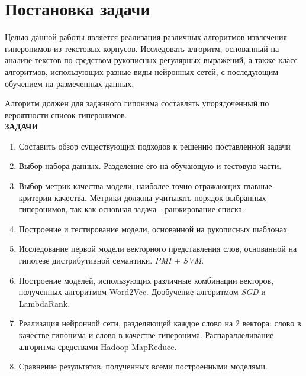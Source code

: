 \section{Постановка задачи}
\label{sec:Chapter_1} 
\large

Целью данной работы является реализация различных алгоритмов извлечения
гиперонимов из текстовых корпусов. Исследовать алгоритм, основанный на анализе
текстов по средством рукописных регулярных выражений, а также класс алгоритмов,
использующих разные виды нейронных сетей, с последующим обучением на размеченных
данных.

Алгоритм должен для заданного гипонима составлять упорядоченный по вероятности
список гиперонимов.\\



\textbf{ЗАДАЧИ}

\begin{enumerate}
\item Составить обзор существующих подходов к решению поставленной задачи
\item Выбор набора данных. Разделение его на обучающую и тестовую части.
\item Выбор метрик качества модели, наиболее точно отражающих главные критерии
качества. Метрики должны учитывать порядок выбранных гиперонимов, так как
основная задача - ранжирование списка.
\item Построение и тестирование модели, основанной на рукописных шаблонах
\item Исследование первой модели векторного представления слов, основанной на гипотезе
дистрибутивной семантики. \textit{PMI} + \textit{SVM}.
\item Построение моделей, использующих различные комбинации векторов, полученных
алгоритмом Word2Vec. Дообучение алгоритмом \textit{SGD} и LambdaRank.
\item Реализация нейронной сети, разделяющей каждое слово на 2 вектора: слово в
качестве гипонима и слово в качестве гиперонима. Распараллеливание алгоритма
средствами Hadoop MapReduce.
\item Сравнение результатов, полученных всеми построенными моделями.
\end{enumerate}

